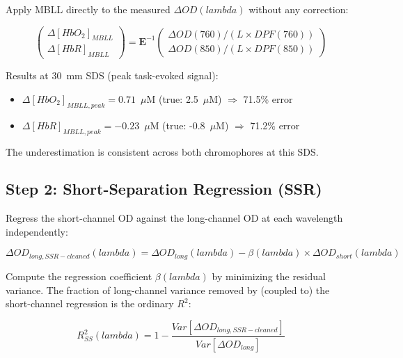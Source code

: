 \documentclass[12pt]{article}
\def\lambda{lambda}%
\def\mathrm#1{#1}%
\def\text#1{#1}%
\begin{document}
Apply MBLL directly to the measured $\Delta\text{OD}(\lambda)$ without any correction:

\begin{equation}
\begin{pmatrix} \Delta[\text{HbO}_2]_{\text{MBLL}} \\ \Delta[\text{HbR}]_{\text{MBLL}} \end{pmatrix} = \mathbf{E}^{-1} \begin{pmatrix} \Delta\text{OD}(760) / (L \times \text{DPF}(760)) \\ \Delta\text{OD}(850) / (L \times \text{DPF}(850)) \end{pmatrix}
\end{equation}

Results at 30~mm SDS (peak task-evoked signal):
\begin{itemize}
\item $\Delta[\text{HbO}_2]_{\text{MBLL, peak}} = 0.71$~$\mu$M (true: 2.5~$\mu$M) $\Rightarrow$ 71.5\% error
\item $\Delta[\text{HbR}]_{\text{MBLL, peak}} = -0.23$~$\mu$M (true: -0.8~$\mu$M) $\Rightarrow$ 71.2\% error
\end{itemize}

The underestimation is consistent across both chromophores at this SDS.

\subsection{Step 2: Short-Separation Regression (SSR)}

Regress the short-channel OD against the long-channel OD at each wavelength independently:

\begin{equation}
\Delta\text{OD}_{\text{long, SSR-cleaned}}(\lambda) = \Delta\text{OD}_{\text{long}}(\lambda) - \beta(\lambda) \times \Delta\text{OD}_{\text{short}}(\lambda)
\end{equation}

Compute the regression coefficient $\beta(\lambda)$ by minimizing the residual variance. The fraction of long-channel variance removed by (coupled to) the short-channel regression is the ordinary $R^2$:

\begin{equation}
R^2_{\mathrm{SS}}(\lambda) = 1 - \frac{\text{Var}[\Delta\text{OD}_{\text{long, SSR-cleaned}}]}{\text{Var}[\Delta\text{OD}_{\text{long}}]}
\end{equation}
\end{document}
